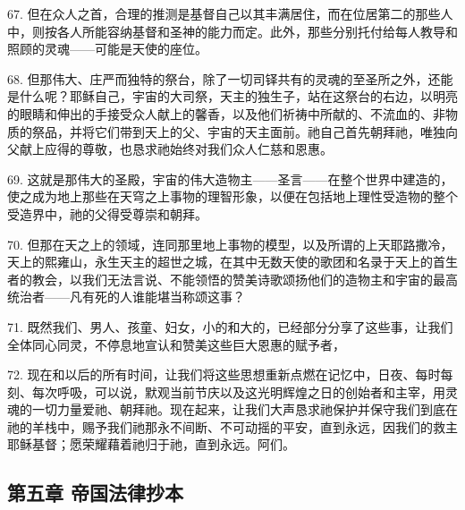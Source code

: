 67. 但在众人之首，合理的推测是基督自己以其丰满居住，而在位居第二的那些人中，则按各人所能容纳基督和圣神的能力而定。此外，那些分别托付给每人教导和照顾的灵魂——可能是天使的座位。\par

68. 但那伟大、庄严而独特的祭台，除了一切司铎共有的灵魂的至圣所之外，还能是什么呢？耶稣自己，宇宙的大司祭，天主的独生子，站在这祭台的右边，以明亮的眼睛和伸出的手接受众人献上的馨香，以及他们祈祷中所献的、不流血的、非物质的祭品，并将它们带到天上的父、宇宙的天主面前。祂自己首先朝拜祂，唯独向父献上应得的尊敬，也恳求祂始终对我们众人仁慈和恩惠。\par

69. 这就是那伟大的圣殿，宇宙的伟大造物主——圣言——在整个世界中建造的，使之成为地上那些在天穹之上事物的理智形象，以便在包括地上理性受造物的整个受造界中，祂的父得受尊崇和朝拜。\par

70. 但那在天之上的领域，连同那里地上事物的模型，以及所谓的上天耶路撒冷，天上的熙雍山，永生天主的超世之城，在其中无数天使的歌团和名录于天上的首生者的教会，以我们无法言说、不能领悟的赞美诗歌颂扬他们的造物主和宇宙的最高统治者——凡有死的人谁能堪当称颂这事？\par

71. 既然我们、男人、孩童、妇女，小的和大的，已经部分分享了这些事，让我们全体同心同灵，不停息地宣认和赞美这些巨大恩惠的赋予者，\par

72. 现在和以后的所有时间，让我们将这些思想重新点燃在记忆中，日夜、每时每刻、每次呼吸，可以说，默观当前节庆以及这光明辉煌之日的创始者和主宰，用灵魂的一切力量爱祂、朝拜祂。现在起来，让我们大声恳求祂保护并保守我们到底在祂的羊栈中，赐予我们祂那永不间断、不可动摇的平安，直到永远，因我们的救主耶稣基督；愿荣耀藉着祂归于祂，直到永远。阿们。\par


\subsection{第五章 帝国法律抄本}

